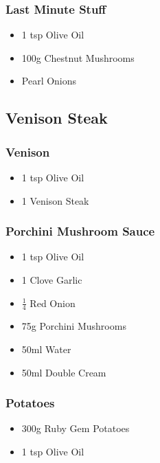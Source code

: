 \documentclass[11pt, english]{article}
\begin{document}
		\subsubsection*{Last Minute Stuff}

	\begin{itemize}
	\setlength\itemsep{0cm}
		\item 1 tsp Olive Oil
		\item 100g Chestnut Mushrooms
		\item Pearl Onions
	\end{itemize}

\newpage

	\subsection{Venison Steak}

		\subsubsection*{Venison}

	\begin{itemize}
        \setlength\itemsep{0cm}
                \item 1 tsp Olive Oil
		\item 1 Venison Steak
        \end{itemize}

		\subsubsection*{Porchini Mushroom Sauce}

	\begin{itemize}
        \setlength\itemsep{0cm}
                \item 1 tsp Olive Oil
		\item 1 Clove Garlic
		\item $\frac{1}{4}$ Red Onion
		\item 75g Porchini Mushrooms
		\item 50ml Water
		\item 50ml Double Cream
        \end{itemize}

		\subsubsection*{Potatoes}

        \begin{itemize}
        \setlength\itemsep{0cm}
                \item 300g Ruby Gem Potatoes
		\item 1 tsp Olive Oil
        \end{itemize}
\end{document}
